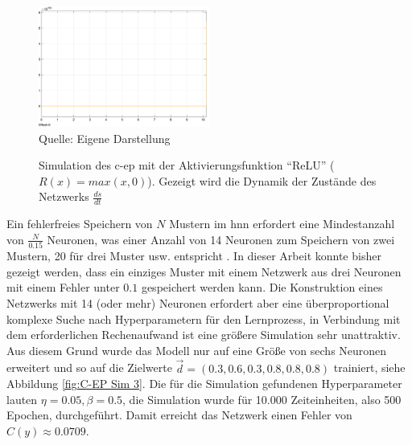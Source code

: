 \begin{figure}[h]
  \label{fig:C-EP Sim 7}
  \caption{Simulation des \ac{c-ep} mit der Aktivierungsfunktion "`ReLU"' (\(R(x)=max(x,0)\)). Gezeigt wird die Dynamik der Zustände des Netzwerks \(\frac{ds}{dt}\)}
  \centering
  \includegraphics[width=0.5\textwidth]{abbildungen/c_ep_sim_7_state_dynamics.png}
  \\
  Quelle: Eigene Darstellung
\end{figure}

Ein fehlerfreies Speichern von \(N\) Mustern im \ac{hnn} erfordert eine Mindestanzahl von \(\frac{N}{0.15}\) Neuronen, was einer Anzahl von 14 Neuronen zum Speichern von zwei Mustern, 20 für drei Muster usw. entspricht \cite[vgl. S. 2556]{Hopfield1982}. In dieser Arbeit konnte bisher gezeigt werden, dass ein einziges Muster mit einem Netzwerk aus drei Neuronen mit einem Fehler unter \(0.1\) gespeichert werden kann. Die Konstruktion eines Netzwerks mit 14 (oder mehr) Neuronen erfordert aber eine überproportional komplexe Suche nach Hyperparametern für den Lernprozess, in Verbindung mit dem erforderlichen Rechenaufwand ist eine größere Simulation sehr unattraktiv. Aus diesem Grund wurde das Modell nur auf eine Größe von sechs Neuronen erweitert und so auf die Zielwerte \(\vec{d}=(0.3,0.6,0.3,0.8,0.8,0.8)\) trainiert, siehe Abbildung \ref{fig:C-EP Sim 3}. Die für die Simulation gefundenen Hyperparameter lauten \(\eta=0.05,\beta=0.5\), die Simulation wurde für 10.000 Zeiteinheiten, also 500 Epochen, durchgeführt. Damit erreicht das Netzwerk einen Fehler von \(C(y)\approx0.0709\).

